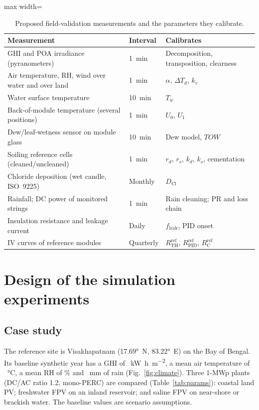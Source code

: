 \documentclass[preprint,11pt]{elsarticle}
\newcommand{\TOWsym}{\mathit{TOW}}
\begin{document}
\begin{table}[!t]
\caption{Proposed field-validation measurements and the parameters they calibrate.}
\label{tab:val}
\centering
\footnotesize
\begin{adjustbox}{max width=\textwidth}
\begin{tabular}{@{}p{56mm}p{16mm}p{56mm}@{}}
\toprule
Measurement & Interval & Calibrates \\
\midrule
GHI and POA irradiance (pyranometers) & 1~min & Decomposition, transposition, clearness \\
Air temperature, RH, wind over water and over land & 1~min & $\alpha$, $\Delta T_d$, $k_v$ \\
Water surface temperature & 10~min & $T_w$ \\
Back-of-module temperature (several positions) & 1~min & $U_0$, $U_1$ \\
Dew/leaf-wetness sensor on module glass & 10~min & Dew model, $\TOWsym$ \\
Soiling reference cells (cleaned/uncleaned) & 1~min & $r_d$, $r_s$, $k_d$, $k_s$, cementation \\
Chloride deposition (wet candle, ISO~9225) & Monthly & $D_{\mathrm{Cl}}$ \\
Rainfall; DC power of monitored strings & 1~min & Rain cleaning; PR and loss chain \\
Insulation resistance and leakage current & Daily & $f_{\mathrm{leak}}$, PID onset \\
IV curves of reference modules & Quarterly & $R_{\mathrm{TH}}^{\mathrm{ref}}$, $R_{\mathrm{PID}}^{\mathrm{ref}}$, $R_{\mathrm{C}}^{\mathrm{ref}}$ \\
\bottomrule
\end{tabular}
\end{adjustbox}
\end{table}

\section{Design of the simulation experiments}\label{sec:experiments}

\subsection{Case study}
The reference site is Visakhapatnam (\ang{17.69}~N, \ang{83.22}~E) on the Bay of Bengal. Its baseline synthetic year
has a GHI of \GHI~\si{\kilo\watt\hour\per\square\metre}, a mean air temperature of \Tair~\si{\celsius}, a mean RH of
\RHair\% and \Rain~mm of rain (Fig.~\ref{fig:climate}). Three 1-MWp plants (DC/AC ratio 1.2, mono-PERC) are compared
(Table~\ref{tab:params}): coastal land PV; freshwater FPV on an inland reservoir; and saline FPV on near-shore or
brackish water. The baseline values are scenario assumptions.
\end{document}
